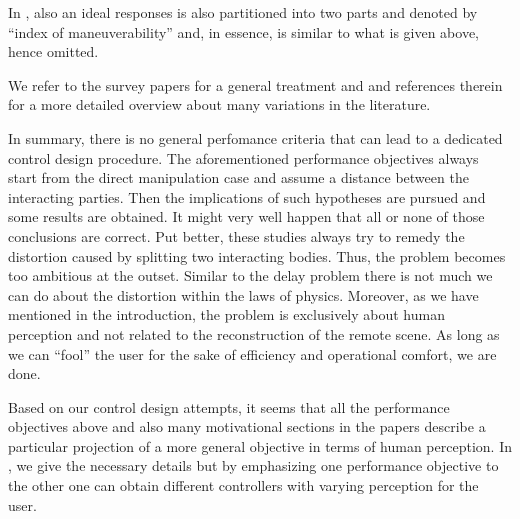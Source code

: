 In \cite{yokokohjiyoshikawa}, also an ideal responses is also partitioned into two parts and denoted by \enquote{index of 
maneuverability} and, in essence, is similar to what is given above, hence omitted. 

We refer to the survey papers \cite{hokayemspong,passenberg} for a general treatment and \cite{klomp,dennis} and references 
therein for a more detailed overview about many variations in the literature.


In summary, there is no general perfomance criteria that can lead to a dedicated control design procedure. The aforementioned 
performance objectives always start from the direct manipulation case and assume a distance between the interacting parties.
Then the implications of such hypotheses are pursued and some results are obtained. It might very well happen that all or none 
of those conclusions are correct. Put better, these studies always try to remedy the distortion caused by splitting two 
interacting bodies. Thus, the problem becomes too ambitious at the outset. Similar to the delay problem there is not much
we can do about the distortion within the laws of physics. Moreover, as we have mentioned in the introduction, the problem is 
exclusively about human perception and not related to the reconstruction of the remote scene. As long as we can \enquote{fool}
the user for the sake of efficiency and operational comfort, we are done. 


Based on our control design attempts, it seems that all the performance objectives above and also many motivational sections 
in the papers describe a particular projection of a more general objective in terms of human perception. In , 
we give the necessary details but by emphasizing one performance objective to the other one can obtain different controllers
with varying perception for the user. 





